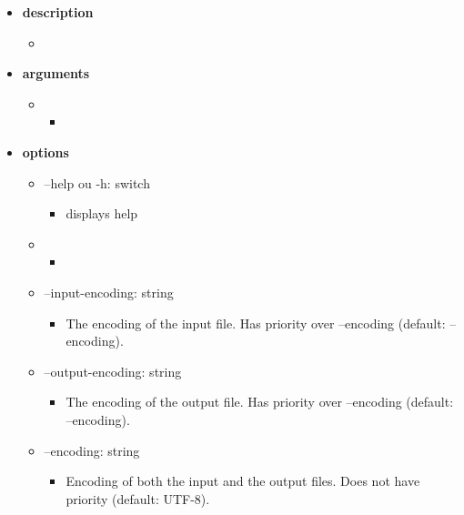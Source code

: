 \documentclass[manual-fr.tex]{subfiles}
\begin{document}
\begin{itemize}
    \item[] \textbf{description}
        \begin{itemize}
            \item[] 
        \end{itemize}
    \item[] \textbf{arguments}
        \begin{itemize}
            \item[] 
                \begin{itemize}
                    \item[] 
                \end{itemize}
        \end{itemize}
    \item[] \textbf{options}
        \begin{itemize}
            \item[] --help ou -h: switch
                \begin{itemize}
                    \item[] displays help
                \end{itemize}
            \item[] 
                \begin{itemize}
                    \item[] 
                \end{itemize}
            \item[] --input-encoding: string
                \begin{itemize}
                    \item[] The encoding of the input file. Has priority over --encoding (default: --encoding).
                \end{itemize}
            \item[] --output-encoding: string
                \begin{itemize}
                    \item[] The encoding of the output file. Has priority over --encoding (default: --encoding).
                \end{itemize}
            \item[] --encoding: string
                \begin{itemize}
                    \item[] Encoding of both the input and the output files. Does not have priority (default: UTF-8).
                \end{itemize}

\end{itemize}
\end{itemize}
\end{document}
